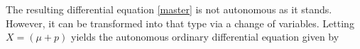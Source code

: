 \documentclass[abstract=on,notitlepage,superscriptaddress,nofootinbib,aps,showpacs,twocolumn,prd]{revtex4}
\newcommand{\0}{^{(0)}}
\newcommand{\1}{^{(1)}}
\newcommand{\2}{^{(2)}}
\newcommand{\3}{{}^{(3)}}
\begin{document}
The resulting differential equation \eqref{master} is not autonomous as it stands. However, it can be transformed into that type via a change of variables. Letting $X=(\mu+p)$ yields the autonomous ordinary differential equation given by
\end{document}
